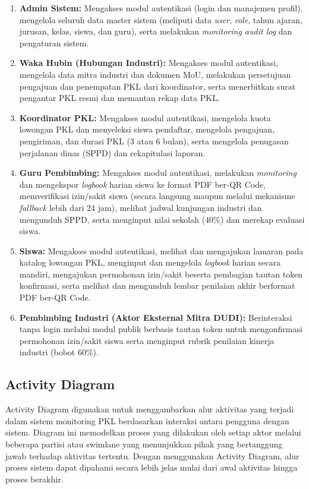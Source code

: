 \begin{enumerate}[label=\alph*.]
\item \textbf{Admin Sistem:} Mengakses modul autentikasi (login dan manajemen profil), mengelola seluruh data master sistem (meliputi data \textit{user}, \textit{role}, tahun ajaran, jurusan, kelas, siswa, dan guru), serta melakukan \textit{monitoring audit log} dan pengaturan sistem.
\item \textbf{Waka Hubin (Hubungan Industri):} Mengakses modul autentikasi, mengelola data mitra industri dan dokumen MoU, melakukan persetujuan pengajuan dan penempatan PKL dari koordinator, serta menerbitkan surat pengantar PKL resmi dan memantau rekap data PKL.
\item \textbf{Koordinator PKL:} Mengakses modul autentikasi, mengelola kuota lowongan PKL dan menyeleksi siswa pendaftar, mengelola pengajuan, pengiriman, dan durasi PKL (3 atau 6 bulan), serta mengelola penugasan perjalanan dinas (SPPD) dan rekapitulasi laporan.
\item \textbf{Guru Pembimbing:} Mengakses modul autentikasi, melakukan \textit{monitoring} dan mengekspor \textit{logbook} harian siswa ke format PDF ber-QR Code, memverifikasi izin/sakit siswa (secara langsung maupun melalui mekanisme \textit{fallback} lebih dari 24 jam), melihat jadwal kunjungan industri dan mengunduh SPPD, serta menginput nilai sekolah (40\%) dan merekap evaluasi siswa.
\item \textbf{Siswa:} Mengakses modul autentikasi, melihat dan mengajukan lamaran pada katalog lowongan PKL, menginput dan mengelola \textit{logbook} harian secara mandiri, mengajukan permohonan izin/sakit beserta pembagian tautan token konfirmasi, serta melihat dan mengunduh lembar penilaian akhir berformat PDF ber-QR Code.
\item \textbf{Pembimbing Industri (Aktor Eksternal Mitra DUDI):} Berinteraksi tanpa login melalui modul publik berbasis tautan token untuk mengonfirmasi permohonan izin/sakit siswa serta menginput rubrik penilaian kinerja industri (bobot 60\%).
\end{enumerate}

\subsection{Activity Diagram}

Activity Diagram digunakan untuk menggambarkan alur aktivitas yang terjadi dalam sistem monitoring PKL berdasarkan interaksi antara pengguna dengan sistem. Diagram ini memodelkan proses yang dilakukan oleh setiap aktor melalui beberapa partisi atau swimlane yang menunjukkan pihak yang bertanggung jawab terhadap aktivitas tertentu. Dengan menggunakan Activity Diagram, alur proses sistem dapat dipahami secara lebih jelas mulai dari awal aktivitas hingga proses berakhir.

